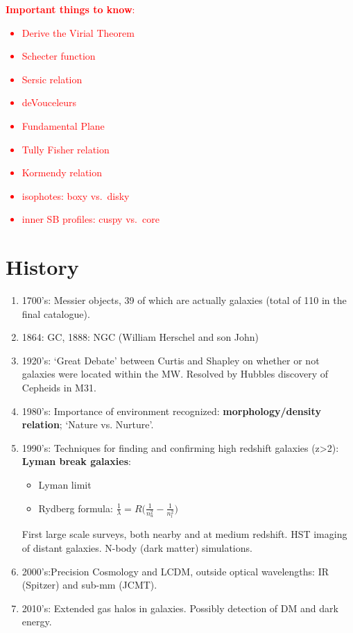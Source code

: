 \documentclass{article}
\begin{document}
\tableofcontents
\newpage

\textcolor{red}{\textbf{Important things to know}:
\begin{itemize}
    \item Derive the Virial Theorem
    \item Schecter function
    \item Sersic relation
    \item deVouceleurs
    \item Fundamental Plane
    \item Tully Fisher relation
    \item Kormendy relation
    \item isophotes: boxy vs.\ disky
    \item inner SB profiles: cuspy vs.\ core
\end{itemize}
}

\section{History}
\begin{enumerate}
  \item 1700's: Messier objects, 39 of
  which are actually galaxies (total of 110 in the final catalogue).
  \item 1864: GC, 1888: NGC (William Herschel and son John)
  \item 1920's: `Great Debate' between Curtis and Shapley on whether
  or not galaxies were located within the MW\@. Resolved by Hubbles
  discovery of Cepheids in M31.
  \item 1980's: Importance of environment recognized:
  \textbf{morphology/density relation}; `Nature vs. Nurture'.
  \item 1990's: Techniques for finding and confirming high redshift
  galaxies (z>2): \textbf{Lyman break galaxies}:
  \begin{itemize}
    \item Lyman limit
    \item Rydberg formula: $\frac{1}{\lambda}=
    R\Big(\frac{1}{n_u^2}-\frac{1}{n_l^2}\Big) $
  \end{itemize}
  First large scale surveys, both nearby and at medium redshift. HST
  imaging of distant galaxies. N-body (dark matter) simulations.
  \item 2000's:Precision Cosmology and LCDM, outside optical
  wavelengths: IR (Spitzer) and sub-mm (JCMT).
  \item 2010's: Extended gas halos in galaxies. Possibly detection of
  DM and dark energy.
\end{enumerate}
\end{document}
